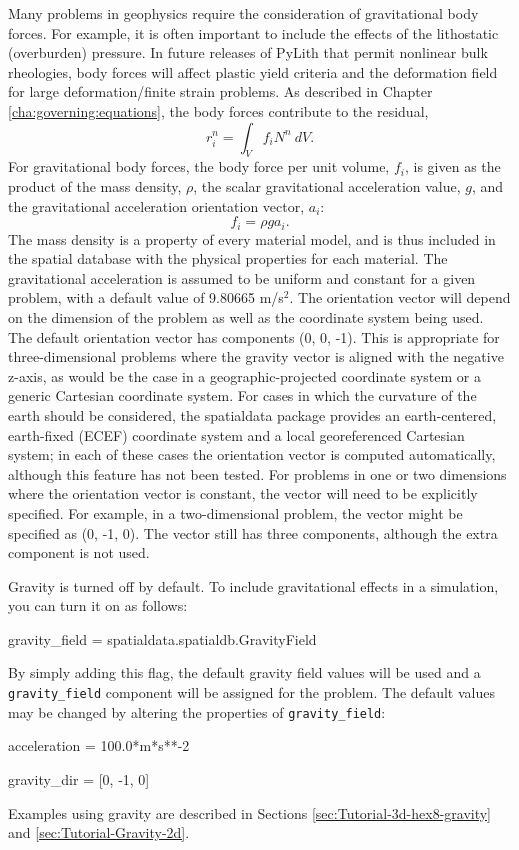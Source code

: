 Many problems in geophysics require the consideration of gravitational
body forces. For example, it is often important to include the effects
of the lithostatic (overburden) pressure. In future releases of PyLith
that permit nonlinear bulk rheologies, body forces will affect plastic
yield criteria and the deformation field for large deformation/finite
strain problems. As described in Chapter \vref{cha:governing:equations},
the body forces contribute to the residual,
\begin{equation}
r_{i}^{n}=\int_{V}f_{i}N^{n}\: dV.
\end{equation}
For gravitational body forces, the body force per unit volume, $f_{i}$,
is given as the product of the mass density, $\rho$, the scalar gravitational
acceleration value, $g$, and the gravitational acceleration orientation
vector, $a_{i}$:
\begin{equation}
f_{i}=\rho ga_{i}.
\end{equation}
The mass density is a property of every material model, and is thus
included in the spatial database with the physical properties for
each material. The gravitational acceleration is assumed to be uniform
and constant for a given problem, with a default value of 9.80665
m/s$^{\text{2}}$. The orientation vector will depend on the dimension
of the problem as well as the coordinate system being used. The default
orientation vector has components (0, 0, -1). This is appropriate
for three-dimensional problems where the gravity vector is aligned
with the negative z-axis, as would be the case in a geographic-projected
coordinate system or a generic Cartesian coordinate system. For cases
in which the curvature of the earth should be considered, the spatialdata
package provides an earth-centered, earth-fixed (ECEF) coordinate
system and a local georeferenced Cartesian system; in each of these
cases the orientation vector is computed automatically, although this
feature has not been tested. For problems in one or two dimensions
where the orientation vector is constant, the vector will need to
be explicitly specified. For example, in a two-dimensional problem,
the vector might be specified as (0, -1, 0). The vector still has
three components, although the extra component is not used.

Gravity is turned off by default. To include gravitational effects
in a simulation, you can turn it on as follows:
\begin{lyxcode}

gravity\_field = spatialdata.spatialdb.GravityField
\end{lyxcode}
By simply adding this flag, the default gravity field values will
be used and a \texttt{gravity\_field} component will be assigned for
the problem. The default values may be changed by altering the properties
of \texttt{gravity\_field}:
\begin{lyxcode}

acceleration = 100.0{*}m{*}s{*}{*}-2

gravity\_dir = [0, -1, 0]
\end{lyxcode}
Examples using gravity are described in Sections \vref{sec:Tutorial-3d-hex8-gravity}
and \vref{sec:Tutorial-Gravity-2d}.

